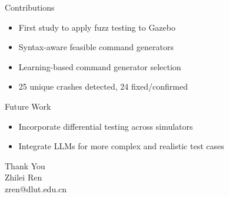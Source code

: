 \documentclass{beamer}
\begin{document}
\begin{frame}{Contributions}
\begin{itemize}
\item First study to apply fuzz testing to Gazebo
\item Syntax-aware feasible command generators
\item Learning-based command generator selection
\item 25 unique crashes detected, 24 fixed/confirmed
\end{itemize}
\end{frame}

\begin{frame}{Future Work}
\begin{itemize}
\item Incorporate differential testing across simulators
\item Integrate LLMs for more complex and realistic test cases
\end{itemize}
\end{frame}

\begin{frame}
\centering
\Large
Thank You\\
\vspace{1cm}
Zhilei Ren\\
\small
zren@dlut.edu.cn
\end{frame}
\end{document}
